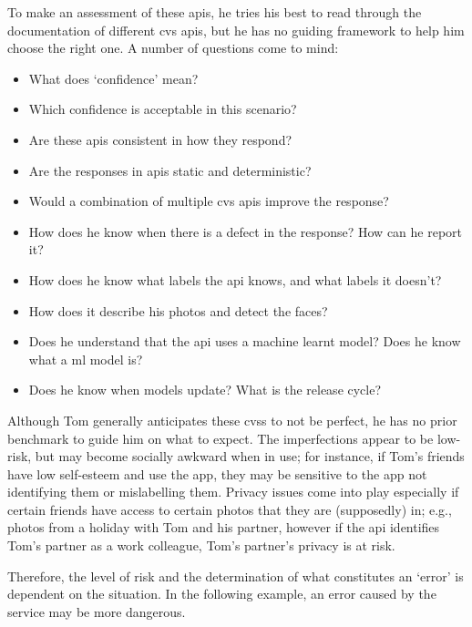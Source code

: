

To make an assessment of these \glspl{api}, he tries his best to read through the documentation of different \gls{cvs} \glspl{api}, but he has no guiding framework to help him choose the right one. A number of questions come to mind:

\begin{itemize}
  \item What does `confidence' mean?%
  \item Which confidence is acceptable in this scenario?%
  \item Are these \glspl{api} consistent in how they respond?%
  \item Are the responses in \glspl{api} static and deterministic?%
  \item Would a combination of multiple \gls{cvs} \glspl{api} improve the response?%
  \item How does he know when there is a defect in the response? How can he report it?%
  \item How does he know what labels the \gls{api} knows, and what labels it doesn't?%
  \item How does it describe his photos and detect the faces?%
  \item Does he understand that the \gls{api} uses a machine learnt model? Does he know what a \gls{ml} model is?%
  \item Does he know when models update? What is the release cycle?%
\end{itemize}

Although Tom generally anticipates these \glspl{cvs} to not be perfect, he has no prior benchmark to guide him on what to expect. The imperfections appear to be low-risk, but may become socially awkward when in use; for instance, if Tom's friends have low self-esteem and use the app, they may be sensitive to the app not identifying them or mislabelling them. Privacy issues come into play especially if certain friends have access to certain photos that they are (supposedly) in; e.g., photos from a holiday with Tom and his partner, however if the \gls{api} identifies Tom's partner as a work colleague, Tom's partner's privacy is at risk.

Therefore, the level of risk and the determination of what constitutes an `error' is dependent on the situation. In the following example, an error caused by the service may be more dangerous.

